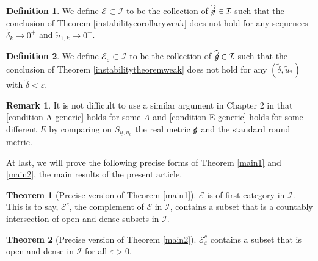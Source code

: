 \documentclass[11pt,reqno]{amsart}
\theoremstyle{definition}
\newtheorem{theorem}{Theorem}[section]
\newtheorem{definition}{Definition}[section]
\newtheorem{remark}{Remark}[section]
\numberwithin{equation}{section}
\def\ub{\underline{u}}
\newcommand{\tdelta}{\widetilde{\delta}}
\newcommand{\tu}{\widetilde{u}}
\def\gs{\mbox{$g \mkern -9mu /$}}
\begin{document}
\begin{definition} We define $\mathcal{E}\subset \mathcal{I}$ to be the  collection of $\widehat{\gs}\in\mathcal{I}$ such that the conclusion of Theorem \ref{instabilitycorollaryweak} does not hold for any sequences $\tdelta_k\to0^+$ and $\tu_{1,k}\to 0^-$.
\end{definition}
\begin{definition} We define $\mathcal{E}_\varepsilon\subset \mathcal{I}$ to be the  collection of $\widehat{\gs}\in\mathcal{I}$ such that the conclusion of Theorem \ref{instabilitytheoremweak} does not hold for any $(\tdelta, \tu_*)$ with $\tdelta<\varepsilon$.
\end{definition}

 \begin{remark}
 It is not difficult to use a similar argument in Chapter 2 in \cite{Chr} that \eqref{condition-A-generic} holds for some $A$ and \eqref{condition-E-generic} holds for some different $E$ by comparing  on $S_{\ub,u_0}$ the real metric $\gs$ and the standard round metric.
 \end{remark}
At last, we will prove the following precise forms of Theorem \ref{main1} and \ref{main2}, the main results of the present article.\begin{theorem}[Precise version of Theorem \ref{main1}]\label{main1precise} $\mathcal{E}$ is of first category in $\mathcal{I}$. This is to say, 
$\mathcal{E}^c$, the complement of $\mathcal{E}$ in $\mathcal{I}$, contains a subset that is a countably intersection of open and dense subsets in $\mathcal{I}$.
\end{theorem}
\begin{theorem}[Precise version of Theorem \ref{main2}]\label{main2precise} $\mathcal{E}_\varepsilon^c$ contains a subset that is open and dense in $\mathcal{I}$ for all $\varepsilon>0$.
\end{theorem}
\end{document}

